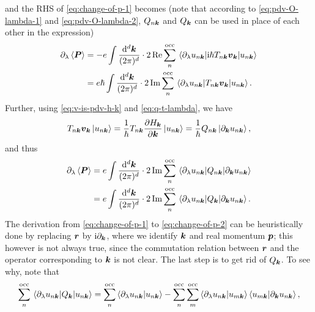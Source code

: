 \documentclass[hyperref, a4paper]{article}
\newcommand*{\ii}{\mathrm{i}}
\begin{document}
and the RHS of \eqref{eq:change-of-p-1} becomes 
(note that according to \eqref{eq:pdv-O-lambda-1} and \eqref{eq:pdv-O-lambda-2},
$Q_{n \vb*{k}}$ and $Q_{\vb*{k}}$ 
can be used in place of each other in the expression)
\begin{equation}
    \begin{aligned}
        \partial_\lambda \expval{\vb*{P}}
        &= - e \int \frac{\dd[d]{\vb*{k}}}{(2\pi)^d} 
        \cdot 2 \Re \sum_{n}^{\text{occ}} 
        \mel{\partial_\lambda u_{n \vb*{k}}}{\ii \hbar T_{n \vb*{k}} \vb*{v}_{\vb*{k}}}{u_{n \vb*{k}}} \\
        &= e \hbar \int \frac{\dd[d]{\vb*{k}}}{(2\pi)^d} 
        \cdot 2 \Im \sum_{n}^{\text{occ}} 
        \mel{\partial_\lambda u_{n \vb*{k}}}{T_{n \vb*{k}} \vb*{v}_{\vb*{k}}}{u_{n \vb*{k}}}.
    \end{aligned}
\end{equation}
Further, using \eqref{eq:v-is-pdv-h-k} and \eqref{eq:q-t-lambda}, we have 
\[
    T_{n \vb*{k}} \vb*{v}_{\vb*{k}} \ket*{u_{n \vb*{k}}}
    = \frac{1}{\hbar} T_{n \vb*{k}} \pdv{H_{\vb*{k}}}{\vb*{k}} \ket*{u_{n \vb*{k}}}
    = \frac{1}{\hbar} Q_{n \vb*{k}} \ket*{\partial_{\vb*{k}} u_{n \vb*{k}}},
\]
and thus 
\begin{equation}
    \begin{aligned}
        \partial_{\lambda} \expval{\vb*{P}}
        &= e \int \frac{\dd[d]{\vb*{k}}}{(2\pi)^d} 
        \cdot 2 \Im \sum_{n}^{\text{occ}} 
        \mel{\partial_\lambda u_{n \vb*{k}}}{Q_{n \vb*{k}}}{\partial_{\vb*{k}} u_{n \vb*{k}}} \\
        &= e \int \frac{\dd[d]{\vb*{k}}}{(2\pi)^d} 
        \cdot 2 \Im \sum_{n}^{\text{occ}} 
        \mel{\partial_\lambda u_{n \vb*{k}}}{Q_{\vb*{k}}}{\partial_{\vb*{k}} u_{n \vb*{k}}}.
    \end{aligned}
    \label{eq:change-of-p-2}
\end{equation}
The derivation from \eqref{eq:change-of-p-1} to \eqref{eq:change-of-p-2}
can be heuristically done by replacing $\vb*{r}$ by $\ii \partial_{\vb*{k}}$,
where we identify $\vb*{k}$ and real momentum $\vb*{p}$;
this however is not always true, 
since the commutation relation between $\vb*{r}$ and 
the operator corresponding to $\vb*{k}$ is not clear.
The last step is to get rid of $Q_{\vb*{k}}$.
To see why, note that 
\[
    \sum_{n}^{\text{occ}} \mel{\partial_\lambda u_{n \vb*{k}}}{Q_{\vb*{k}}}{u_{n \vb*{k}}}
    = \sum_{n}^{\text{occ}} \braket{\partial_\lambda u_{n \vb*{k}}}{u_{n \vb*{k}}}
    - \sum_{n}^{\text{occ}} \sum_{m}^{\text{occ}}
    \braket{\partial_{\lambda} u_{n \vb*{k}}}{u_{m \vb*{k}}}
    \braket{u_{m \vb*{k}}}{\partial_{\vb*{k}} u_{n \vb*{k}}},
\]
\end{document}
